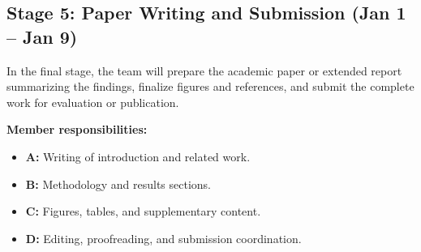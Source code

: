 \subsection{Stage 5: Paper Writing and Submission (Jan 1 -- Jan 9)}
In the final stage, the team will prepare the academic paper or extended report summarizing the findings, finalize figures and references, and submit the complete work for evaluation or publication.

\textbf{Member responsibilities:}
\begin{itemize}
    \item \textbf{A:} Writing of introduction and related work.
    \item \textbf{B:} Methodology and results sections.
    \item \textbf{C:} Figures, tables, and supplementary content.
    \item \textbf{D:} Editing, proofreading, and submission coordination.
\end{itemize}
